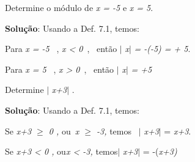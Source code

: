 \begin{texemplo}

Determine o módulo de \textit{x = -5}  e \textit{x = 5}.~~ 

\textbf{Solução}: Usando a Def. 7.1, temos:

\quad Para \textit{x = -5}~ , \textit{x < 0}~,~ então  $ \vert $ \textit{x}$ \vert $  \textit{= -(-5) = + 5}.~~~~~ 

\quad Para \textit{x = 5}~ , \textit{x > 0}~,~ então  $ \vert $ \textit{x}$ \vert $  \textit{= +5 }\qedsymbol{}~~~~ 
\end{texemplo}

\begin{texemplo}
	
Determine $ \vert $ \textit{x+3}$ \vert $ .~~ 

\textbf{Solução}: Usando a Def. 7.1, temos:

\quad Se \textit{x+3 $ \geq $  0 , }ou\textit{~x $ \geq $  -3,  }temos\textit{~ }$ \vert $ \textit{x+3}$ \vert $  = \textit{x+3}.

\quad Se \textit{x+3 < 0 , }ou\textit{x < -3,  }temos\textit{}$ \vert $ \textit{x+3}$ \vert $  = -(\textit{x+3) }\qedsymbol{}
\end{texemplo}

